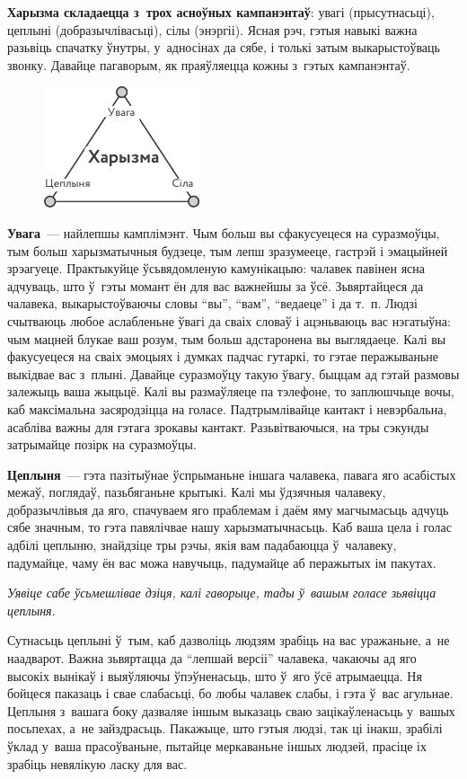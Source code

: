\textbf{Харызма складаецца з~трох асноўных кампанэнтаў}: увагі (прысутнасьці), цеплыні (добразычлівасьці), сілы (энэргіі). Ясная рэч, гэтыя навыкі важна разьвіць спачатку ўнутры, у~адносінах да сябе, і толькі затым выкарыстоўваць звонку. Давайце пагаворым, як праяўляецца кожны з~гэтых кампанэнтаў.

\begin{figure}[htb!]
  \centering
  \includegraphics[scale=1.5]{willpower/ch9/10.pdf}
\end{figure}

\textbf{Увага}~--- найлепшы камплімэнт. Чым больш вы сфакусуецеся на суразмоўцы, тым больш харызматычныя будзеце, тым лепш зразумееце, гастрэй і эмацыйней зрэагуеце. Практыкуйце ўсьвядомленую камунікацыю: чалавек павінен ясна адчуваць, што ў~гэты момант ён для вас важнейшы за ўсё. Зьвяртайцеся да чалавека, выкарыстоўваючы словы ``вы'', ``вам'', ``ведаеце'' і да т.~п. Людзі счытваюць любое аслабленьне ўвагі да сваіх словаў і ацэньваюць вас нэгатыўна: чым мацней блукае ваш розум, тым больш адстаронена вы выглядаеце. Калі вы факусуецеся на сваіх эмоцыях і думках падчас гутаркі, то гэтае перажываньне выкідвае вас з~плыні. Давайце суразмоўцу такую ўвагу, быццам ад гэтай размовы залежыць ваша жыцьцё. Калі вы размаўляеце па тэлефоне, то заплюшчыце вочы, каб максімальна засяродзіцца на голасе. Падтрымлівайце кантакт і невэрбальна, асабліва важны для гэтага зрокавы кантакт. Разьвітваючыся, на тры сэкунды затрымайце позірк на суразмоўцы.

\textbf{Цеплыня}~--- гэта пазітыўнае ўспрыманьне іншага чалавека, павага яго асабістых межаў, поглядаў, пазьбяганьне крытыкі. Калі мы ўдзячныя чалавеку, добразычлівыя да яго, спачуваем яго праблемам і даём яму магчымасьць адчуць сябе значным, то гэта павялічвае нашу харызматычнасьць. Каб ваша цела і голас адбілі цеплыню, знайдзіце тры рэчы, якія вам падабаюцца ў~чалавеку, падумайце, чаму ён вас можа навучыць, падумайце аб перажытых ім пакутах.

\emph{Уявіце сабе ўсьмешлівае дзіця, калі гаворыце, тады ў~вашым голасе зьявіцца цеплыня.}

Сутнасьць цеплыні ў~тым, каб дазволіць людзям зрабіць на вас уражаньне, а~не наадварот. Важна зьвяртацца да ``лепшай версіі'' чалавека, чакаючы ад яго высокіх вынікаў і выяўляючы ўпэўненасьць, што ў~яго ўсё атрымаецца. Ня бойцеся паказаць і свае слабасьці, бо любы чалавек слабы, і гэта ў~вас агульнае. Цеплыня з~вашага боку дазваляе іншым выказаць сваю зацікаўленасьць у~вашых посьпехах, а~не зайздрасьць. Пакажыце, што гэтыя людзі, так ці інакш, зрабілі ўклад у~ваша прасоўваньне, пытайце меркаваньне іншых людзей, прасіце іх зрабіць невялікую ласку для вас.

